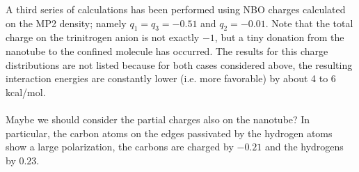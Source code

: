 \documentclass{article}
\begin{document}
%
A third series of calculations has been performed using NBO charges calculated on the MP2 density; namely $q_1 = q_3 = -0.51$ and $q_2 = -0.01$. Note that the total charge on the trinitrogen anion is not exactly $-1$, but a tiny donation from the nanotube to the confined molecule has occurred. The results for this charge distributions are not listed because for both cases considered above, the resulting interaction energies are constantly lower (i.e. more favorable) by about 4 to 6 kcal/mol.\\
\\
Maybe we should consider the partial charges also on the nanotube? In particular, the carbon atoms on the edges passivated by the hydrogen atoms show a large polarization, the carbons are charged by $-0.21$ and the hydrogens by $0.23$.
\end{document}
